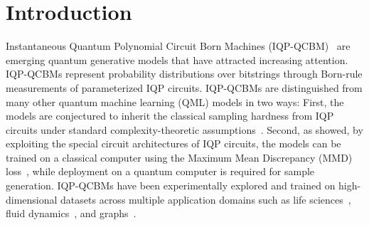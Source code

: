 \documentclass{article}
\theoremstyle{plain}
\theoremstyle{definition}
\theoremstyle{remark}
\begin{document}
\section{Introduction}
Instantaneous Quantum Polynomial Circuit Born Machines (IQP-QCBM)~\citep{shepherd09,Liu18} are emerging quantum generative models that have attracted increasing attention. IQP-QCBMs represent probability distributions over bitstrings through Born-rule measurements of parameterized IQP circuits. IQP-QCBMs are distinguished from many other quantum machine learning (QML) models in two ways: First, the models are conjectured to inherit the classical sampling hardness from IQP circuits under standard complexity-theoretic assumptions~\citep{Bremner10,Bremner16}. Second, as \citet{recioarmengol25} showed, by exploiting the special circuit architectures of IQP circuits, the models can be trained on a classical computer using the Maximum Mean Discrepancy (MMD) loss~\citep{gretton12}, while deployment on a quantum computer is required for sample generation. IQP-QCBMs have been experimentally explored and trained on high-dimensional datasets across multiple application domains such as life sciences~\citep{11250278}, fluid dynamics~\citep{liu2026generativequantumutilitycorrelationcomplexity}, and graphs~\citep{jcdk-q3xc}. 
\end{document}
